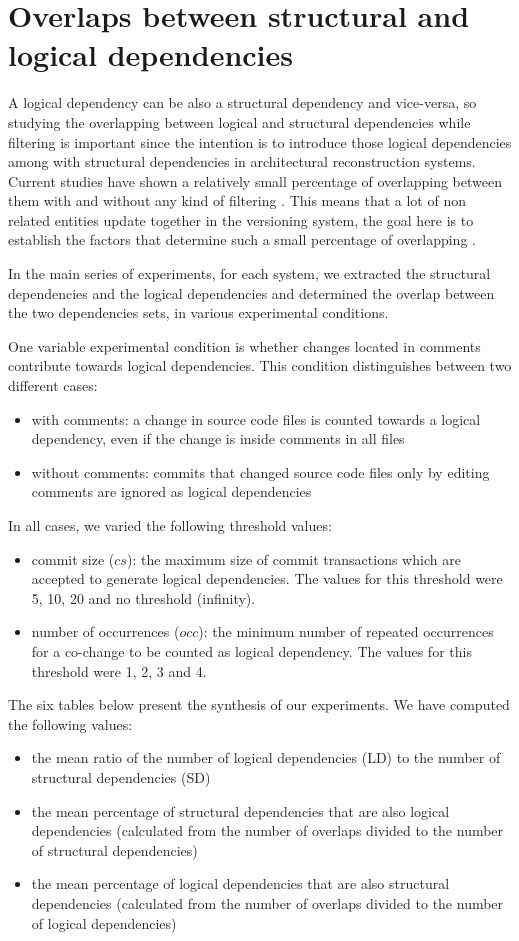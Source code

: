 \documentclass[12pt]{mitthesis}
\begin{document}
\section{Overlaps between structural and logical dependencies}
A logical dependency can be also a structural dependency and vice-versa, so studying the overlapping between logical and structural dependencies while filtering is important since the intention is to introduce those logical dependencies among with structural dependencies in architectural reconstruction systems. Current studies have shown a relatively small percentage of overlapping between them with and without any kind of filtering \cite{DBLP:journals/jss/AjienkaC17}. This means that a lot of non related entities update together in the versioning system, the goal here is to establish the factors that determine such a small percentage of overlapping \cite{enase19}.


In the main series of experiments, for each system, we extracted the structural dependencies and the logical dependencies and determined the overlap between the two dependencies sets, in various experimental conditions. 

One variable experimental condition is whether changes located in comments contribute towards logical dependencies. This condition distinguishes between two different cases: 
\begin{itemize}
	\item with comments: a change in source code files is counted towards a logical dependency, even if the change is inside comments in all files
	\item without comments: commits that changed source code files only by editing comments are ignored as logical dependencies
\end{itemize}

In all cases, we varied the following threshold values: 
 \begin{itemize}
	\item commit size ($cs$): the maximum size of commit transactions which are accepted to generate logical dependencies. The values for this threshold were 5, 10, 20 and no threshold (infinity).  
	\item number of occurrences ($occ$): the minimum number of repeated occurrences for a co-change to be counted as logical dependency. The values for this threshold were 1, 2, 3 and 4.  
\end{itemize}

The six tables below present the synthesis of our experiments. 
We have computed the following  values:
\begin{itemize}
	\item the mean ratio of the number of logical dependencies  (LD) to the number of structural dependencies (SD)
   \item the mean percentage of structural dependencies that are also logical dependencies (calculated from the number of overlaps divided to the number of structural dependencies)	
		\item the mean percentage of logical dependencies that are also structural dependencies (calculated from the number of overlaps divided to the number of logical dependencies)
\end{itemize}
\end{document}
